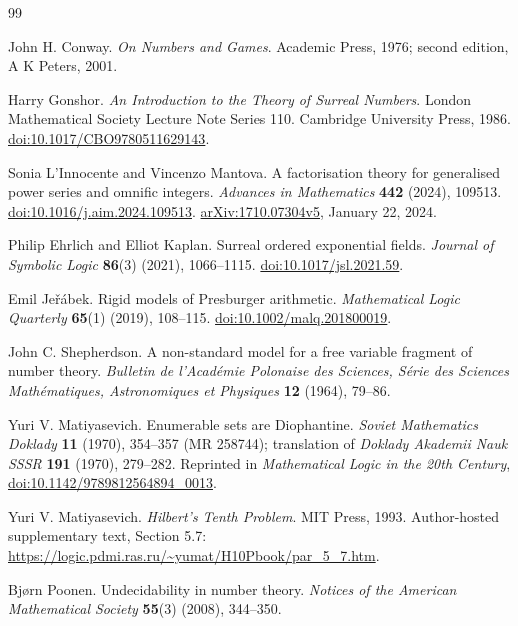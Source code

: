 \documentclass[11pt,oneside]{article}
\numberwithin{equation}{section}
\theoremstyle{definition}
\theoremstyle{remark}
\begin{document}
\begin{thebibliography}{99}
\small\raggedright

John H. Conway.
\emph{On Numbers and Games}.
Academic Press, 1976; second edition, A K Peters, 2001.

Harry Gonshor.
\emph{An Introduction to the Theory of Surreal Numbers}.
London Mathematical Society Lecture Note Series 110.
Cambridge University Press, 1986.
\href{https://doi.org/10.1017/CBO9780511629143}{doi:10.1017/CBO9780511629143}.

Sonia L'Innocente and Vincenzo Mantova.
A factorisation theory for generalised power series and omnific integers.
\emph{Advances in Mathematics} \textbf{442} (2024), 109513.
\href{https://doi.org/10.1016/j.aim.2024.109513}{doi:10.1016/j.aim.2024.109513}.
\href{https://arxiv.org/abs/1710.07304v5}{arXiv:1710.07304v5},
January 22, 2024.

Philip Ehrlich and Elliot Kaplan.
Surreal ordered exponential fields.
\emph{Journal of Symbolic Logic} \textbf{86}(3) (2021), 1066--1115.
\href{https://doi.org/10.1017/jsl.2021.59}{doi:10.1017/jsl.2021.59}.

Emil Je\v r\'abek.
Rigid models of Presburger arithmetic.
\emph{Mathematical Logic Quarterly} \textbf{65}(1) (2019), 108--115.
\href{https://doi.org/10.1002/malq.201800019}{doi:10.1002/malq.201800019}.

John C. Shepherdson.
A non-standard model for a free variable fragment of number theory.
\emph{Bulletin de l'Acad\'emie Polonaise des Sciences, S\'erie des Sciences
Math\'ematiques, Astronomiques et Physiques} \textbf{12} (1964), 79--86.

Yuri V. Matiyasevich.
Enumerable sets are Diophantine.
\emph{Soviet Mathematics Doklady} \textbf{11} (1970), 354--357 (MR 258744);
translation of \emph{Doklady Akademii Nauk SSSR} \textbf{191} (1970),
279--282. Reprinted in \emph{Mathematical Logic in the 20th Century},
\href{https://doi.org/10.1142/9789812564894_0013}{doi:10.1142/9789812564894\_0013}.

Yuri V. Matiyasevich.
\emph{Hilbert's Tenth Problem}. MIT Press, 1993.
Author-hosted supplementary text, Section 5.7:
\url{https://logic.pdmi.ras.ru/~yumat/H10Pbook/par_5_7.htm}.

Bj{\o}rn Poonen.
Undecidability in number theory.
\emph{Notices of the American Mathematical Society} \textbf{55}(3) (2008),
344--350.


\end{thebibliography}
\end{document}
